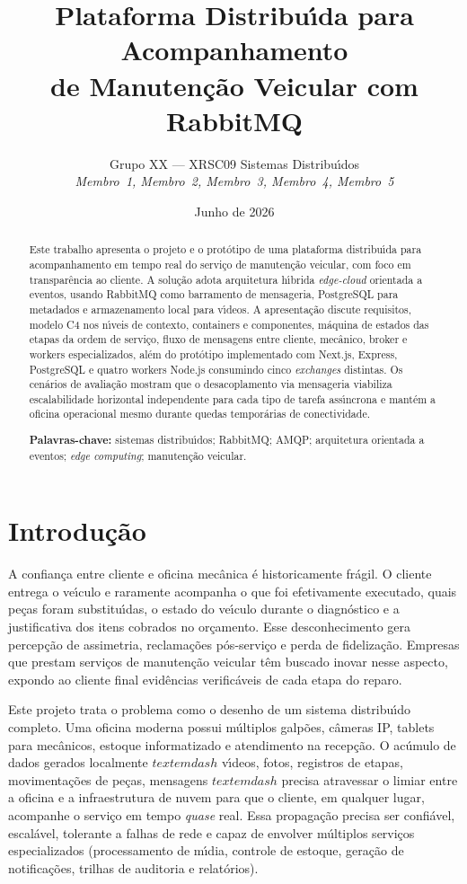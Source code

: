 \documentclass[10pt,a4paper]{article}
\title{\textbf{Plataforma Distribu\'\i da para Acompanhamento\\ de Manuten\c{c}\~ao Veicular com RabbitMQ}}
\author{Grupo XX --- XRSC09 Sistemas Distribu\'\i dos\\
\textit{Membro~1, Membro~2, Membro~3, Membro~4, Membro~5}}
\date{Junho de 2026}
\begin{document}
\maketitle

\begin{abstract}
\noindent Este trabalho apresenta o projeto e o prot\'otipo de uma plataforma distribu\'\i da para acompanhamento em tempo real do servi\c{c}o de manuten\c{c}\~ao veicular, com foco em transpar\^encia ao cliente. A solu\c{c}\~ao adota arquitetura h\'\i brida \emph{edge-cloud} orientada a eventos, usando RabbitMQ como barramento de mensageria, PostgreSQL para metadados e armazenamento local para v\'\i deos. A apresenta\c{c}\~ao discute requisitos, modelo C4 nos n\'\i veis de contexto, containers e componentes, m\'aquina de estados das etapas da ordem de servi\c{c}o, fluxo de mensagens entre cliente, mec\^anico, broker e workers especializados, al\'em do prot\'otipo implementado com Next.js, Express, PostgreSQL e quatro workers Node.js consumindo cinco \emph{exchanges} distintas. Os cen\'arios de avalia\c{c}\~ao mostram que o desacoplamento via mensageria viabiliza escalabilidade horizontal independente para cada tipo de tarefa ass\'\i ncrona e mant\'em a oficina operacional mesmo durante quedas tempor\'arias de conectividade.

\medskip
\noindent\textbf{Palavras-chave:} sistemas distribu\'\i dos; RabbitMQ; AMQP; arquitetura orientada a eventos; \emph{edge computing}; manuten\c{c}\~ao veicular.
\end{abstract}

\section{Introdu\c{c}\~ao}

A confian\c{c}a entre cliente e oficina mec\^anica \'e historicamente fr\'agil. O cliente entrega o ve\'\i culo e raramente acompanha o que foi efetivamente executado, quais pe\c{c}as foram substitu\'\i das, o estado do ve\'\i culo durante o diagn\'ostico e a justificativa dos itens cobrados no or\c{c}amento. Esse desconhecimento gera percep\c{c}\~ao de assimetria, reclama\c{c}\~oes p\'os-servi\c{c}o e perda de fideliza\c{c}\~ao. Empresas que prestam servi\c{c}os de manuten\c{c}\~ao veicular t\^em buscado inovar nesse aspecto, expondo ao cliente final evid\^encias verific\'aveis de cada etapa do reparo.

Este projeto trata o problema como o desenho de um sistema distribu\'\i do completo. Uma oficina moderna possui m\'ultiplos gal\-p\~oes, c\^ameras IP, tablets para mec\^anicos, estoque informatizado e atendimento na recep\c{c}\~ao. O ac\'umulo de dados gerados localmente \(textemdash\) v\'\i deos, fotos, registros de etapas, movimenta\c{c}\~oes de pe\c{c}as, mensagens \(textemdash\) precisa atravessar o lim\-iar entre a oficina e a infraestrutura de nuvem para que o cliente, em qualquer lugar, acompanhe o servi\c{c}o em tempo \emph{quase} real. Essa propaga\c{c}\~ao precisa ser confi\'avel, escal\'avel, tolerante a falhas de rede e capaz de envolver m\'ultiplos servi\c{c}os especializados (processamento de m\'\i dia, controle de estoque, gera\c{c}\~ao de notifica\c{c}\~oes, trilhas de auditoria e relat\'orios).
\end{document}
